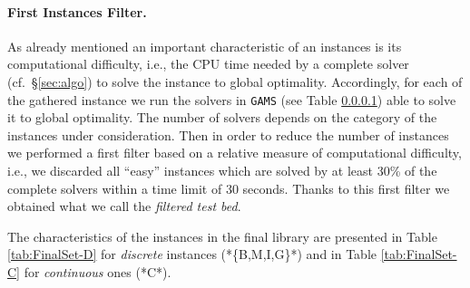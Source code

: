 \paragraph{First Instances Filter.} As already mentioned an important characteristic of an instances is its computational difficulty, i.e., the CPU time needed by a complete solver (cf.~\S \ref{sec:algo}) to solve the instance to global optimality. Accordingly, for each of the gathered instance we run the solvers in {\tt GAMS} (see Table \ref{}) able to solve it to global optimality. The number of solvers depends on the category of the instances under consideration. Then in order to reduce the number of instances we performed a first filter based on a relative measure of computational difficulty, i.e., we discarded all ``easy'' instances which are solved by at least 30\% of the complete solvers within a time limit of 30 seconds. Thanks to this first filter we obtained what we call the {\it filtered test bed}.    



\bigskip
The characteristics of the instances in the final library are presented in Table \ref{tab:FinalSet-D} for \emph{discrete} instances (*\{B,M,I,G\}*) and in Table \ref{tab:FinalSet-C} for \emph{continuous} ones (*C*).

